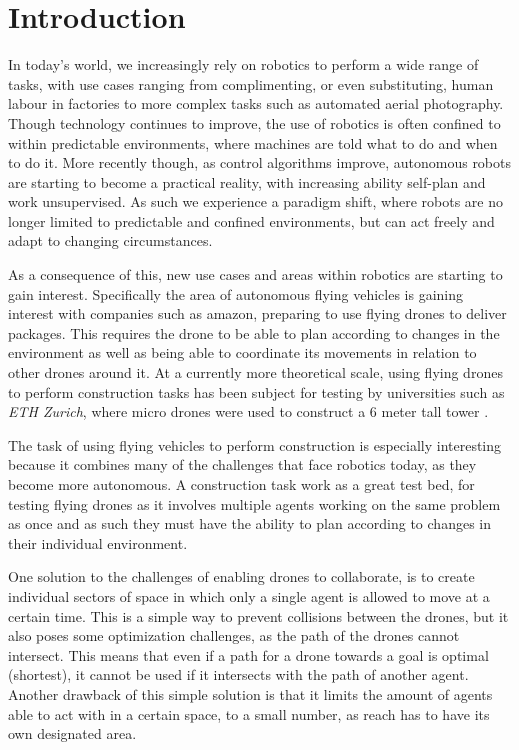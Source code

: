 \chapter{Introduction}

In today's world, we increasingly rely on robotics to perform a wide range of tasks, with use cases ranging from complimenting, or even substituting, human labour in factories to more complex tasks such as automated aerial photography. 
Though technology continues to improve, the use of robotics is often confined to within predictable environments, where machines are told what to do and when to do it. 
More recently though, as control algorithms improve, autonomous robots are starting to become a practical reality, with increasing ability self-plan and work unsupervised. 
As such we experience a paradigm shift, where robots are no longer limited to predictable and confined environments, but can act freely and adapt to changing circumstances. 

As a consequence of this, new use cases and areas within robotics are starting to gain interest. 
Specifically the area of autonomous flying vehicles is gaining interest with companies such as amazon, preparing to use flying drones to deliver packages.
This requires the drone to be able to plan according to changes in the environment as well as being able to coordinate its movements in relation to other drones around it. 
At a currently more theoretical scale, using flying drones to perform construction tasks has been subject for testing by universities such as \textit{ETH Zurich}, where micro drones were used to construct a 6 meter tall tower \cite{augugliaro_flight_2014}. 

The task of using flying vehicles to perform construction is especially interesting because it combines many of the challenges that face robotics today, as they become more autonomous. 
A construction task work as a great test bed, for testing flying drones as it involves multiple agents working on the same problem as once and as such they must have the ability to plan according to changes in their individual environment. 

One solution to the challenges of enabling drones to collaborate, is to create individual sectors of space in which only a single agent is allowed to move at a certain time. 
This is a simple way to prevent collisions between the drones, but it also poses some optimization challenges, as the path of the drones cannot intersect. 
This means that even if a path for a drone towards a goal is optimal (shortest), it cannot be used if it intersects with the path of another agent. 
Another drawback of this simple solution is that it limits the amount of agents able to act with in a certain space, to a small number, as reach has to have its own designated area. 

